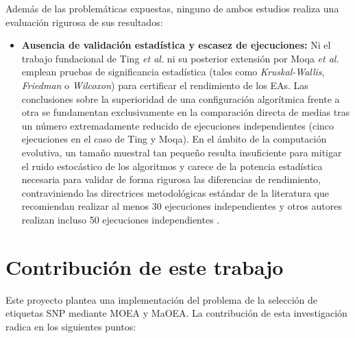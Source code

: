 Además de las problemáticas expuestas, ninguno de ambos estudios realiza una evaluación rigurosa de sus resultados:

\begin{itemize}
    \item \textbf{Ausencia de validación estadística y escasez de ejecuciones:} Ni el trabajo fundacional de Ting \textit{et al.} ni su posterior extensión por Moqa \textit{et al.} emplean pruebas de significancia estadística (tales como \textit{Kruskal-Wallis}, \textit{Friedman} o \textit{Wilcoxon}) para certificar el rendimiento de los EAs. Las conclusiones sobre la superioridad de una configuración algorítmica frente a otra se fundamentan exclusivamente en la comparación directa de medias tras un número extremadamente reducido de ejecuciones independientes (cinco ejecuciones en el caso de Ting y Moqa). En el ámbito de la computación evolutiva, un tamaño muestral tan pequeño resulta insuficiente para mitigar el ruido estocástico de los algoritmos y carece de la potencia estadística necesaria para validar de forma rigurosa las diferencias de rendimiento, contraviniendo las directrices metodológicas estándar de la literatura que recomiendan realizar al menos 30 ejecuciones independientes \cite{granado2020multiobjective} y otros autores realizan incluso 50 ejecuciones independientes \cite{derrac2011practical}.
\end{itemize}

\section{Contribución de este trabajo}

Este proyecto plantea una implementación del problema de la selección de etiquetas SNP mediante MOEA y MaOEA. La contribución de esta investigación radica en los siguientes puntos:

